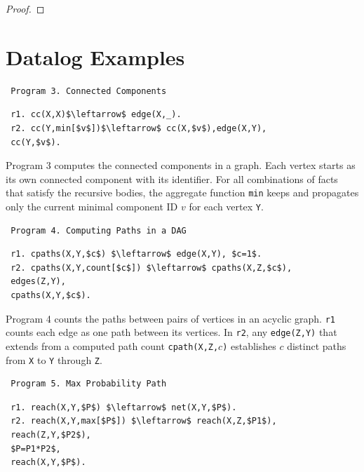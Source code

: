 \begin{appendix}
\begin{proof}
 \end{proof}
 
 
 \section{Datalog Examples}
 \label{sec:app:example}
 
 \begin{verbatim}
 Program 3. Connected Components
 \end{verbatim}\vspace{-0.1in}\small
 \begin{lstlisting}
 r1. cc(X,X)$\leftarrow$ edge(X,_).
 r2. cc(Y,min[$v$])$\leftarrow$ cc(X,$v$),edge(X,Y),
 cc(Y,$v$).
 \end{lstlisting}
 \normalsize
 
 Program 3 computes the connected components in a graph. Each vertex starts as its own connected component with its identifier. For all combinations of facts that satisfy the recursive bodies, the aggregate function \texttt{min} keeps and propagates only the current minimal component ID $v$ for each vertex \texttt{Y}.
 
 \begin{verbatim}
 Program 4. Computing Paths in a DAG
 \end{verbatim}\vspace{-0.1in}\small
 \begin{lstlisting}
 r1. cpaths(X,Y,$c$) $\leftarrow$ edge(X,Y), $c=1$.
 r2. cpaths(X,Y,count[$c$]) $\leftarrow$ cpaths(X,Z,$c$),
 edges(Z,Y),
 cpaths(X,Y,$c$).
 \end{lstlisting}
 \normalsize
 
 Program 4 counts the paths between pairs of vertices in an acyclic graph. \texttt{r1} counts each edge as one path between its vertices. In \texttt{r2}, any \texttt{edge(Z,Y)} that extends from a computed path count \texttt{cpath(X,Z,$c$)} establishes $c$ distinct paths from \texttt{X} to \texttt{Y} through \texttt{Z}.
 
 
 \begin{verbatim}
 Program 5. Max Probability Path
 \end{verbatim}\vspace{-0.1in}\small
 \begin{lstlisting}
 r1. reach(X,Y,$P$) $\leftarrow$ net(X,Y,$P$).
 r2. reach(X,Y,max[$P$]) $\leftarrow$ reach(X,Z,$P1$),
 reach(Z,Y,$P2$),
 $P=P1*P2$,
 reach(X,Y,$P$).
 \end{lstlisting}
 \normalsize
 

\end{appendix}
